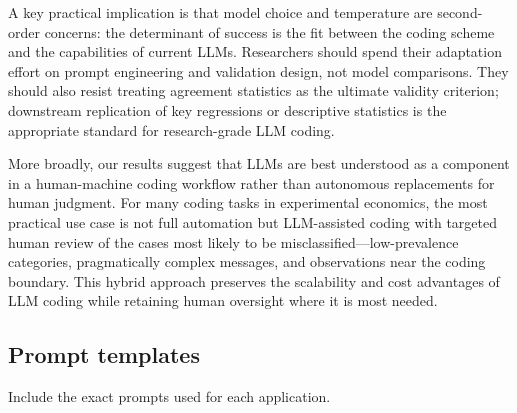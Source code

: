 \documentclass[11pt]{article}
\begin{document}
\begin{sloppypar}
A key practical implication is that model choice and temperature are second-order concerns: the determinant of success is the fit between the coding scheme and the capabilities of current LLMs. Researchers should spend their adaptation effort on prompt engineering and validation design, not model comparisons. They should also resist treating agreement statistics as the ultimate validity criterion; downstream replication of key regressions or descriptive statistics is the appropriate standard for research-grade LLM coding.

More broadly, our results suggest that LLMs are best understood as a component in a human-machine coding workflow rather than autonomous replacements for human judgment. For many coding tasks in experimental economics, the most practical use case is not full automation but LLM-assisted coding with targeted human review of the cases most likely to be misclassified---low-prevalence categories, pragmatically complex messages, and observations near the coding boundary. This hybrid approach preserves the scalability and cost advantages of LLM coding while retaining human oversight where it is most needed.



\newpage
\singlespacing



\clearpage
\begin{appendices}


\section{Prompt templates}
Include the exact prompts used for each application.


\end{appendices}
\end{sloppypar}
\end{document}
